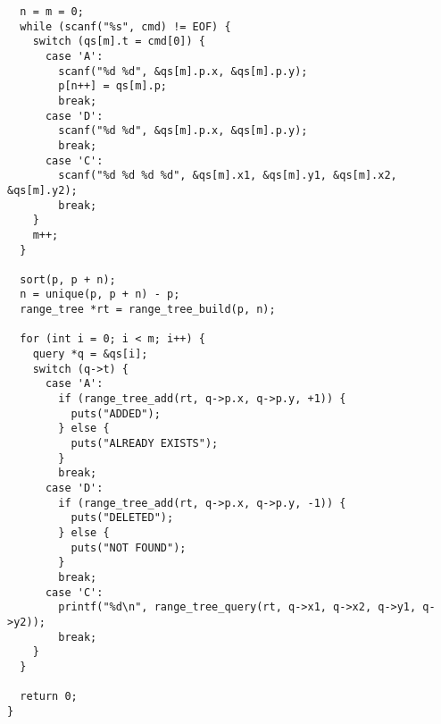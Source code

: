 \begin{verbatim}
  n = m = 0;
  while (scanf("%s", cmd) != EOF) {
    switch (qs[m].t = cmd[0]) {
      case 'A':
        scanf("%d %d", &qs[m].p.x, &qs[m].p.y);
        p[n++] = qs[m].p;
        break;
      case 'D':
        scanf("%d %d", &qs[m].p.x, &qs[m].p.y);
        break;
      case 'C':
        scanf("%d %d %d %d", &qs[m].x1, &qs[m].y1, &qs[m].x2, &qs[m].y2);
        break;
    }
    m++;
  }

  sort(p, p + n);
  n = unique(p, p + n) - p;
  range_tree *rt = range_tree_build(p, n);

  for (int i = 0; i < m; i++) {
    query *q = &qs[i];
    switch (q->t) {
      case 'A':
        if (range_tree_add(rt, q->p.x, q->p.y, +1)) {
          puts("ADDED");
        } else {
          puts("ALREADY EXISTS");
        }
        break;
      case 'D':
        if (range_tree_add(rt, q->p.x, q->p.y, -1)) {
          puts("DELETED");
        } else {
          puts("NOT FOUND");
        }
        break;
      case 'C':
        printf("%d\n", range_tree_query(rt, q->x1, q->x2, q->y1, q->y2));
        break;
    }
  }

  return 0;
}
\end{verbatim}
